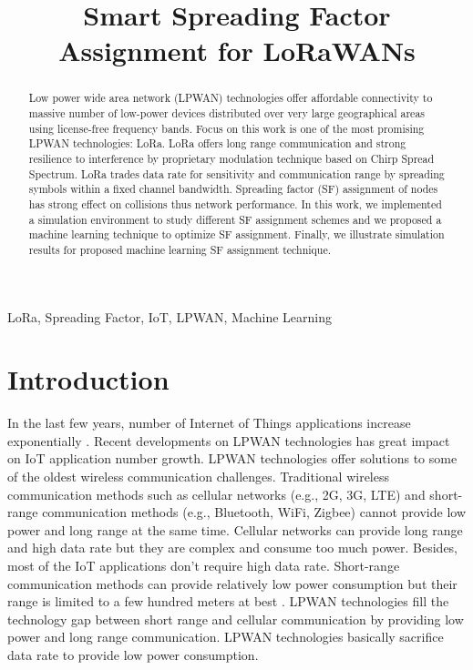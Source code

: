 \documentclass[conference]{IEEEtran}
\begin{document}
\title{Smart Spreading Factor Assignment for LoRaWANs}


\author{
}
\maketitle


\begin{abstract}
Low power wide area network (LPWAN) technologies offer affordable connectivity to massive number of low-power devices distributed over very large geographical areas using license-free frequency bands. Focus on this work is one of the most promising LPWAN technologies: LoRa. LoRa offers long range communication and strong resilience to interference by proprietary modulation technique based on Chirp Spread Spectrum. LoRa trades data rate for sensitivity and communication range by spreading symbols within a fixed channel bandwidth. Spreading factor (SF) assignment of nodes has strong effect on collisions thus network performance. In this work, we implemented a simulation environment to study different SF assignment schemes and we proposed a machine learning technique to optimize SF assignment. Finally, we illustrate simulation results for proposed machine learning SF assignment technique.
\end{abstract}


\begin{IEEEkeywords}
LoRa, Spreading Factor, IoT, LPWAN, Machine Learning
\end{IEEEkeywords}


\section{Introduction}
\par In the last few years, number of Internet of Things applications increase exponentially \cite{7721743}. Recent developments on LPWAN technologies has great impact on IoT application number growth. LPWAN technologies offer solutions to some of the oldest wireless communication challenges. Traditional wireless communication methods such as cellular networks (e.g., 2G, 3G, LTE) and short-range communication methods (e.g., Bluetooth, WiFi, Zigbee) cannot provide low power and long range at the same time. Cellular networks can provide long range and high data rate but they are complex and consume too much power. Besides, most of the IoT applications don't require high data rate. Short-range communication methods can provide relatively low power consumption but their range is limited to a few hundred meters at best \cite{7815384}. LPWAN technologies fill the technology gap between short range and cellular communication by providing low power and long range communication. LPWAN technologies basically sacrifice data rate to provide low power consumption.
\end{document}
